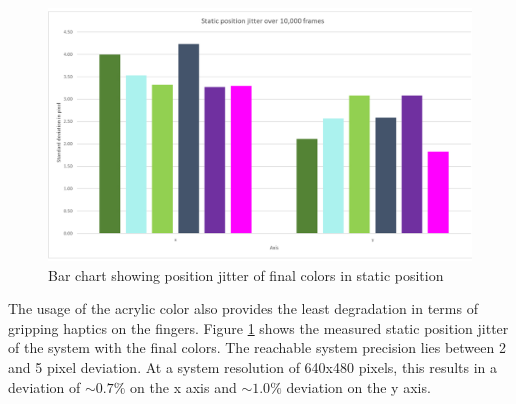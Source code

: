 \begin{figure}[H]
\centering
\includegraphics[width=\textwidth]{images/acrylic_color_jitter.jpg}
\caption{Bar chart showing position jitter of final colors in static position}
\label{img:color_jitter}
\end{figure}
 The usage of the acrylic color also provides the least degradation in terms of gripping haptics on the fingers. Figure \ref{img:color_jitter} shows the measured static position jitter of the system with the final colors. The reachable system precision lies between 2 and 5 pixel deviation. At a system resolution of 640x480 pixels, this results in a deviation of $\sim 0.7\%$ on the x axis and $\sim 1.0\%$ deviation on the y axis.
